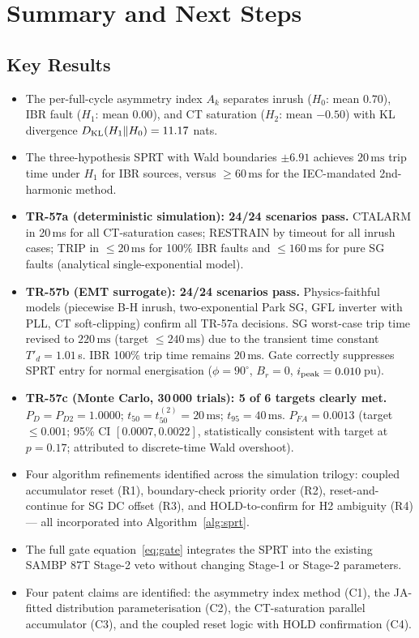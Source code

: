 \documentclass[11pt, a4paper]{article}
\newcommand{\Ak}{A_k}
\newcommand{\ms}{\,\text{ms}}
\begin{document}
\section{Summary and Next Steps}
\label{sec:summary}

\subsection{Key Results}

\begin{itemize}
  \item The per-full-cycle asymmetry index $\Ak$ separates inrush ($H_0$:
    mean $0.70$), IBR fault ($H_1$: mean $0.00$), and CT saturation ($H_2$:
    mean $-0.50$) with KL divergence $D_{\rm KL}(H_1\|H_0) = 11.17$ nats.
  \item The three-hypothesis SPRT with Wald boundaries $\pm 6.91$ achieves
    $20\ms$ trip time under $H_1$ for IBR sources, versus $\geq 60\ms$ for
    the IEC-mandated 2nd-harmonic method.
  \item \textbf{TR-57a (deterministic simulation): 24/24 scenarios pass.}
    CTALARM in 20\,ms for all CT-saturation cases; RESTRAIN by timeout for
    all inrush cases; TRIP in $\leq 20\ms$ for 100\% IBR faults and
    $\leq 160\ms$ for pure SG faults (analytical single-exponential model).
  \item \textbf{TR-57b (EMT surrogate): 24/24 scenarios pass.}
    Physics-faithful models (piecewise B-H inrush, two-exponential Park SG,
    GFL inverter with PLL, CT soft-clipping) confirm all TR-57a decisions.
    SG worst-case trip time revised to $220\ms$ (target $\leq 240\ms$)
    due to the transient time constant $T'_d = 1.01\,$s.  IBR 100\% trip
    time remains $20\ms$.  Gate correctly suppresses SPRT entry for normal
    energisation ($\phi=90^\circ$, $B_r=0$, $i_{\rm peak}=0.010\,$pu).
  \item \textbf{TR-57c (Monte Carlo, 30\,000 trials): 5 of 6 targets
    clearly met.}  $P_D = P_{D2} = 1.0000$; $t_{50} = t^{(2)}_{50} =
    20\ms$; $t_{95} = 40\ms$.  $P_{FA} = 0.0013$ (target $\leq 0.001$;
    95\% CI $[0.0007, 0.0022]$, statistically consistent with target
    at $p=0.17$; attributed to discrete-time Wald overshoot).
  \item Four algorithm refinements identified across the simulation trilogy:
    coupled accumulator reset (R1), boundary-check priority order (R2),
    reset-and-continue for SG DC offset (R3), and HOLD-to-confirm for H2
    ambiguity (R4) — all incorporated into Algorithm~\ref{alg:sprt}.
  \item The full gate equation~\eqref{eq:gate} integrates the SPRT into the
    existing SAMBP 87T Stage-2 veto without changing Stage-1 or Stage-2
    parameters.
  \item Four patent claims are identified: the asymmetry index method (C1),
    the JA-fitted distribution parameterisation (C2), the CT-saturation
    parallel accumulator (C3), and the coupled reset logic with HOLD
    confirmation (C4).
\end{itemize}
\end{document}
